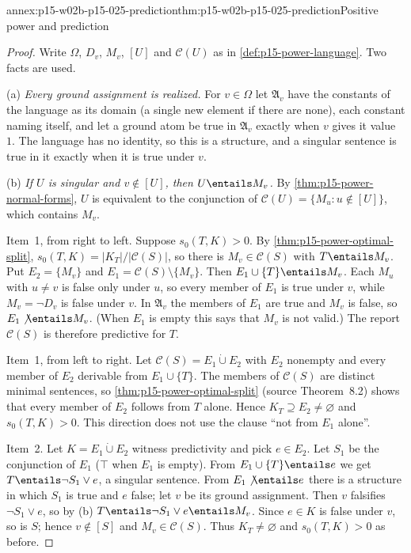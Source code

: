 \begin{annexitem}{annex:p15-w02b-p15-025-prediction}{thm:p15-w02b-p15-025-prediction}{Positive power and prediction}
\begin{proof}
Write \(\Omega\), \(D_v\), \(M_v\), \([U]\) and \(\mathcal C(U)\) as in
\cref{def:p15-power-language}. Two facts are used.

(a) \emph{Every ground assignment is realized.} For \(v\in\Omega\) let
\(\mathfrak A_v\) have the constants of the language as its domain (a single
new element if there are none), each constant naming itself, and let a ground atom be true in
\(\mathfrak A_v\) exactly when \(v\) gives it value~\(1\). The language
has no identity, so this is a structure, and a singular sentence is true
in it exactly when it is true under \(v\).

(b) \emph{If \(U\) is singular and \(v\notin[U]\), then \(U\entails M_v\).}
By \cref{thm:p15-power-normal-forms}, \(U\) is equivalent to the
conjunction of \(\mathcal C(U)=\{M_u:u\notin[U]\}\), which contains
\(M_v\).

Item~1, from right to left. Suppose \(s_0(T,K)>0\). By
\cref{thm:p15-power-optimal-split}, \(s_0(T,K)=|K_T|/|\mathcal C(S)|\),
so there is \(M_v\in\mathcal C(S)\) with \(T\entails M_v\). Put
\(E_2=\{M_v\}\) and \(E_1=\mathcal C(S)\setminus\{M_v\}\). Then
\(E_1\cup\{T\}\entails M_v\). Each \(M_u\) with \(u\neq v\) is false
only under \(u\), so every member of \(E_1\) is true under \(v\), while
\(M_v=\neg D_v\) is false under \(v\). In \(\mathfrak A_v\) the members
of \(E_1\) are true and \(M_v\) is false, so \(E_1\not\entails M_v\).
(When \(E_1\) is empty this says that \(M_v\) is not valid.) The report
\(\mathcal C(S)\) is therefore predictive for \(T\).

Item~1, from left to right. Let \(\mathcal C(S)=E_1\mathbin{\dot\cup}E_2\)
with \(E_2\) nonempty and every member of \(E_2\) derivable from
\(E_1\cup\{T\}\). The members of \(\mathcal C(S)\) are distinct minimal
sentences, so \cref{thm:p15-power-optimal-split} (source
Theorem~8.2) shows that every member of \(E_2\) follows from \(T\)
alone. Hence \(K_T\supseteq E_2\neq\varnothing\) and \(s_0(T,K)>0\).
This direction does not use the clause ``not from \(E_1\) alone''.

Item~2. Let \(K=E_1\mathbin{\dot\cup}E_2\) witness predictivity and pick
\(e\in E_2\). Let \(S_1\) be the conjunction of \(E_1\) (\(\top\) when
\(E_1\) is empty). From \(E_1\cup\{T\}\entails e\) we get
\(T\entails\neg S_1\vee e\), a singular sentence. From
\(E_1\not\entails e\) there is a structure in which \(S_1\) is true and
\(e\) false; let \(v\) be its ground assignment. Then \(v\) falsifies
\(\neg S_1\vee e\), so by (b) \(T\entails\neg S_1\vee e\entails M_v\).
Since \(e\in K\) is false under \(v\), so is \(S\); hence \(v\notin[S]\)
and \(M_v\in\mathcal C(S)\). Thus \(K_T\neq\varnothing\) and
\(s_0(T,K)>0\) as before.


\end{proof}
\end{annexitem}
